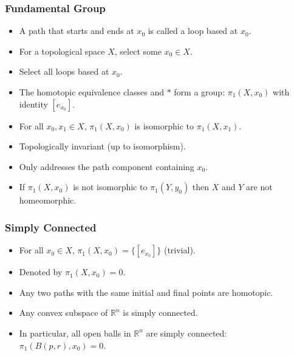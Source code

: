 \documentclass{beamer}
\newcommand{\R}{\mathbb{R}}
\begin{document}
\begin{frame}
  \frametitle{Fundamental Group}
  \begin{itemize}
  \item A path that starts and ends at \(x_0\) is called a loop based at \(x_0\).
  \item For a topological space \(X\), select some \(x_0\in X\).
  \item Select all loops based at \(x_0\).
  \item The homotopic equivalence classes and \(*\) form a group: \(\pi_1(X,x_0)\) with identity \([e_{x_0}]\).
  \item For all \(x_0,x_1\in X\), \(\pi_1(X,x_0)\) is isomorphic to \(\pi_1(X,x_1)\).
  \item Topologically invariant (up to isomorphism).
  \item Only addresses the path component containing \(x_0\).
  \item If \(\pi_1(X,x_0)\) is not isomorphic to \(\pi_1(Y,y_0)\) then \(X\) and \(Y\) are not homeomorphic.
  \end{itemize}
\end{frame}

\begin{frame}
  \frametitle{Simply Connected}
  \begin{itemize}
  \item For all \(x_0\in X\), \(\pi_1(X,x_0)=\{[e_{x_0}]\}\) (trivial).
  \item Denoted by \(\pi_1(X,x_0)=0\).
  \item Any two paths with the same initial and final points are homotopic.
  \item Any convex subspace of \(\R^n\) is simply connected.
  \item In particular, all open balls in \(\R^n\) are simply connected: \(\pi_1(B(p,r),x_0)=0\).
  \end{itemize}
\end{frame}
\end{document}

